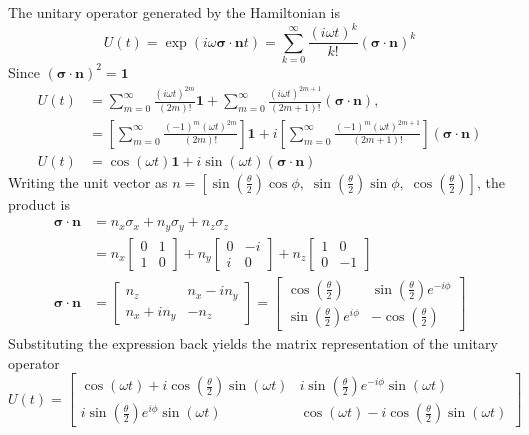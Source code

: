 \documentclass[../../../main.tex]{subfiles}
\begin{document}
The unitary operator generated by the Hamiltonian is
\begin{equation*}
  U(t)  = \exp \left( i \omega \boldsymbol{\sigma}\cdot \mathbf{n }t \right)
  =\sum_{k=0}^{\infty} \frac{(i\omega t)^k}{k!}(\boldsymbol{\sigma} \cdot \mathbf{n})^k
\end{equation*}
Since $(\boldsymbol{\sigma} \cdot \mathbf{n})^2=\mathbf{1}$
\begin{align*}
  U(t) & = \sum_{m=0}^{\infty}\frac{(i\omega t)^{2m}}{(2m)!}\mathbf{1}+ \sum_{m=0}^{\infty}\frac{(i\omega t)^{2m+1}}{(2m+1)!} (\boldsymbol{\sigma} \cdot \mathbf{n}),                                     \\
       & = \left[\sum_{m=0}^{\infty}\frac{(-1)^m(\omega t)^{2m}}{(2m)!}\right] \mathbf{1}+ i\left[\sum_{m=0}^{\infty}\frac{(-1)^m(\omega t)^{2m+1}}{(2m+1)!}\right](\boldsymbol{\sigma} \cdot \mathbf{n}) \\
  U(t) & =  \cos (\omega t) \mathbf{1 }+ i \sin (\omega t) (\boldsymbol{\sigma} \cdot \mathbf{n})
\end{align*}
Writing the unit vector as $n = [\sin\left( \frac{\theta }{2} \right) \cos\phi,\;\sin\left( \frac{\theta }{2} \right) \sin\phi,\;\cos\left( \frac{\theta }{2} \right) ]$, the product is
\begin{align*}
  \boldsymbol{\sigma} \cdot \mathbf{n}
   & = n_x\sigma_x + n_y\sigma_y + n_z\sigma_z                             \\
   & = n_x\begin{bmatrix}0 & 1\\1 & 0\end{bmatrix}
  + n_y\begin{bmatrix}0 & -i\\i & 0\end{bmatrix}
  + n_z\begin{bmatrix}1 & 0\\0 & -1\end{bmatrix}                           \\
  \boldsymbol{\sigma} \cdot \mathbf{n}
   & = \begin{bmatrix} n_z & n_x - i n_y\\ n_x + i n_y & -n_z\end{bmatrix}
  = \begin{bmatrix} \cos\left( \frac{\theta }{2} \right)  & \sin\left( \frac{\theta }{2} \right)  e^{-i\phi}\\ \sin\left( \frac{\theta }{2} \right)  e^{i\phi} & -\cos\left( \frac{\theta }{2} \right) \end{bmatrix}
\end{align*}
Substituting the expression back yields the matrix representation of the unitary operator
\begin{equation*}
  U(t) = \begin{bmatrix}
    \cos(\omega t) + i\cos\left( \frac{\theta }{2} \right)  \sin(\omega t) & i\sin\left( \frac{\theta }{2} \right)  e^{-i\phi}\sin(\omega t)        \\
    i\sin\left( \frac{\theta }{2} \right)  e^{i\phi}\sin(\omega t)         & \cos(\omega t) - i\cos\left( \frac{\theta }{2} \right)  \sin(\omega t)
  \end{bmatrix}
\end{equation*}
\end{document}
